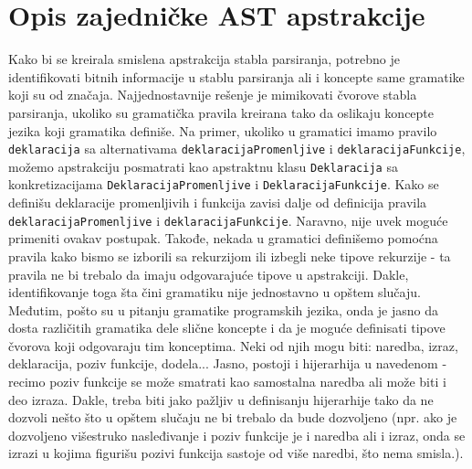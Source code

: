 \chapter{Opis zajedničke AST apstrakcije}
\label{chp:MyAST}

Kako bi se kreirala smislena apstrakcija stabla parsiranja, potrebno je identifikovati bitnih informacije u stablu parsiranja ali i koncepte same gramatike koji su od značaja. Najjednostavnije rešenje je mimikovati čvorove stabla parsiranja, ukoliko su gramatička pravila kreirana tako da oslikaju koncepte jezika koji gramatika definiše. Na primer, ukoliko u gramatici imamo pravilo \texttt{deklaracija} sa alternativama \texttt{deklaracijaPromenljive} i \texttt{deklaracijaFunkcije}, možemo apstrakciju posmatrati kao apstraktnu klasu \texttt{Deklaracija} sa konkretizacijama \texttt{DeklaracijaPromenljive} i \texttt{DeklaracijaFunkcije}. Kako se definišu deklaracije promenljivih i funkcija zavisi dalje od definicija pravila \texttt{deklaracijaPromenljive} i \texttt{deklaracijaFunkcije}. Naravno, nije uvek moguće primeniti ovakav postupak. Takođe, nekada u gramatici definišemo pomoćna pravila kako bismo se izborili sa rekurzijom ili izbegli neke tipove rekurzije - ta pravila ne bi trebalo da imaju odgovarajuće tipove u apstrakciji. Dakle, identifikovanje toga šta čini gramatiku nije jednostavno u opštem slučaju. Međutim, pošto su u pitanju gramatike programskih jezika, onda je jasno da dosta različitih gramatika dele slične koncepte i da je moguće definisati tipove čvorova koji odgovaraju tim konceptima. Neki od njih mogu biti: naredba, izraz, deklaracija, poziv funkcije, dodela... Jasno, postoji i hijerarhija u navedenom - recimo poziv funkcije se može smatrati kao samostalna naredba ali može biti i deo izraza. Dakle, treba biti jako pažljiv u definisanju hijerarhije tako da ne dozvoli nešto što u opštem slučaju ne bi trebalo da bude dozvoljeno (npr. ako je dozvoljeno višestruko nasleđivanje i poziv funkcije je i naredba ali i izraz, onda se izrazi u kojima figurišu pozivi funkcija sastoje od više naredbi, što nema smisla.).

